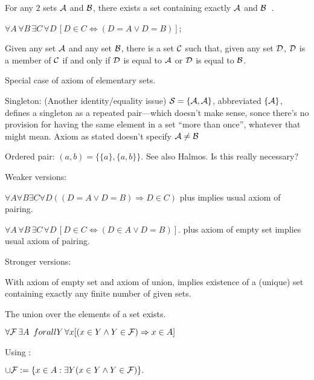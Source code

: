 For any $2$ sets $\mathcal{A}$ and $\mathcal{B}$,
there exists a set containing exactly $\mathcal{A}$ and 
$\mathcal{B}$~\cite{wiki:Axiom_of_pairing}.

$\forall A\,\forall B\,\exists C\,\forall D\,
[D\in C\iff (D=A\lor D=B)]$;

Given any set $\mathcal{A}$ and any set $\mathcal{B}$, 
there is a set $\mathcal{C}$ such that, 
given any set $\mathcal{D}$, 
$\mathcal{D}$ is a member of $\mathcal{C}$ 
if and only if 
$\mathcal{D}$ is equal to $\mathcal{A}$ 
or 
$\mathcal{D}$ is equal to $\mathcal{B}$.

Special case of axiom of elementary 
sets\cite{wiki:Zermelo_set_theory}.

Singleton:
(Another identity/equality issue)
$\mathcal{S}=\{\mathcal{A},\mathcal{A}\}$, abbreviated $\{\mathcal{A}\}$,
defines a singleton as a repeated pair---which doesn't make sense,
sonce there's no provision for having the same element
in a set ``more than once'', whatever that might mean.
Axiom as stated doesn't specify $\mathcal{A} \neq \mathcal{B}$

Ordered pair:
$(a,b)=\{\{a\},\{a,b\}\}$.
See also Halmos\cite{Halmos1960Naive}.
Is this really necessary? 

Weaker versions:
 
${\displaystyle 
\forall A \forall B 
\exists C
\forall D((D=A\lor D=B) \Rightarrow D\in C)}$
plus 
implies usual axiom of pairing.

${\displaystyle 
\forall A\,\forall B\,
\exists C\,
\forall D\,[D\in C\iff (D\in A\lor D=B)]}$.
plus 
axiom of empty set
implies usual axiom of pairing.

Stronger versions:

With axiom of empty set and axiom of union,
implies existence of a (unique) set containing exactly
any finite number of given sets.


\label{sec:Axiom-of-union}

The union over the elements of a set 
exists\cite{wiki:Axiom_of_union}.

$\forall {\ensuremath{\mathcal{F}}}\,
\exists A\,\
forall Y\,\forall x
[(x\in Y\land Y\in {\ensuremath{\mathcal{F}}})\Rightarrow x\in A]$

Using :

${\displaystyle 
\cup {\ensuremath{\mathcal{F}}}:=
\{x\in A:\exists Y(x\in Y\land Y\in {\ensuremath{\mathcal{F}}})\}.}$

\levelstay{Axiom schema of replacement}
\label{sec:Axiom-schema-of-replacement}

